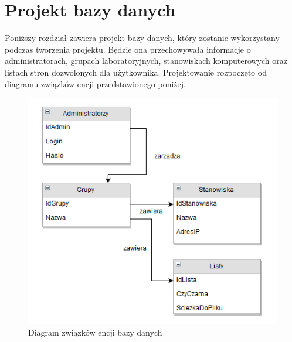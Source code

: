 \section{Projekt bazy danych}
Poniższy rozdział zawiera projekt bazy danych, który zostanie wykorzystany podczas tworzenia projektu. Będzie ona przechowywała informacje o administratorach, grupach laboratoryjnych, stanowiskach komputerowych oraz listach stron dozwolonych dla użytkownika. Projektowanie rozpoczęto od diagramu związków encji przedstawionego poniżej.

\vspace{1.0cm}

\begin{figure} [!ht]
    \centering
    \includegraphics{pti_baza1}
    \caption{Diagram związków encji bazy danych}
    \label{fig:my_label}
\end{figure}